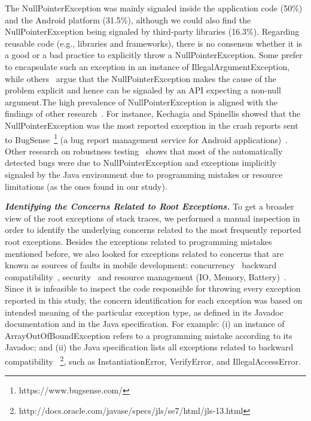  The NullPointerException was mainly signaled inside the application code (50\%) and the Android platform (31.5\%),
 although we could also find the NullPointerException being signaled by third-party libraries (16.3\%).
Regarding reusable code (e.g., libraries and frameworks), there is no consensus whether it is a good or a bad practice to
explicitly throw a NullPointerException. Some prefer to encapsulate such an exception in
an instance of IllegalArgumentException, while others~\cite{bloch2008effective} argue that the
NullPointerException makes the cause of the problem explicit and hence
can be signaled by an API expecting a non-null argument.The high prevalence of NullPointerException is aligned with the
findings of other
research~\cite{kim2013predicting,fraser20131600,csallner2004jcrasher,kechagia2014}.
For instance, Kechagia and Spinellis showed that the NullPointerException was the
most reported exception in the crash reports sent to BugSense~\footnote{https://www.bugsense.com/} (a bug report
management service for Android applications)~\cite{kechagia2014}.
Other research on robustness testing~\cite{maji2012empirical,csallner2004jcrasher} shows that most of the automatically
detected bugs were due to NullPointerException and exceptions
implicitly signaled by the Java
environment due to programming mistakes or resource limitations
 (as the ones found in our study).


\emph{\textbf{Identifying the Concerns Related to Root Exceptions.}} To get a broader view of the root exceptions of stack traces,
we performed a manual inspection in order to identify the underlying
concerns related to the most frequently reported root exceptions.
Besides the exceptions related to programming mistakes mentioned before, we also looked for exceptions related to concerns that are known as sources of faults in mobile development: concurrency~\cite{ama2012} backward compatibility~\cite{McDon13}, security~\cite{enck2011study,was2010} and resource management (IO, Memory, Battery)~\cite{Zhang12}. Since it is infeasible to inspect the code responsible for throwing every exception reported in this study,
the concern identification for each exception was based on intended
meaning of the particular exception type, as defined in
its Javadoc documentation and in the Java specification.
For example: (i) an instance of ArrayOutOfBoundException
refers to a programming mistake according to its Javadoc; and (ii) the Java specification lists all
exceptions related to backward compatibility
~\footnote{http://docs.oracle.com/javase/specs/jls/se7/html/jls-13.html}, such as
InstantiationError, VerifyError, and IllegalAccessError.

